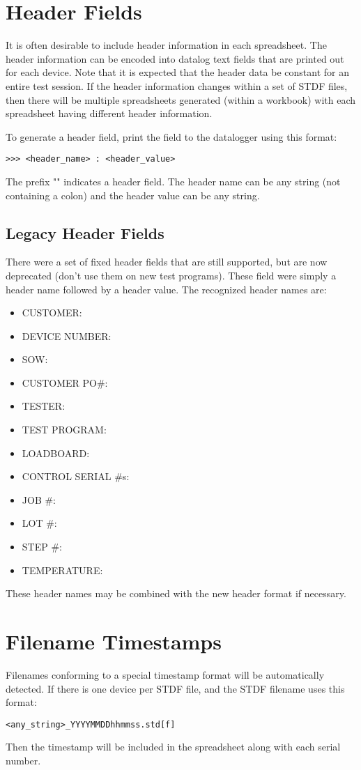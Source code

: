 \documentclass[letterpaper]{article}
\begin{document}
\section{Header Fields}
It is often desirable to include header information in each spreadsheet.  The header information
can be encoded into datalog text fields that are printed out for each device.  Note that it is
expected that the header data be constant for an entire test session.  If the header information
changes within a set of STDF files, then there will be multiple spreadsheets generated (within a workbook)
with each spreadsheet having different header information.

To generate a header field, print the field to the datalogger using this format:
\begin{verbatim}
>>> <header_name> : <header_value>
\end{verbatim}
The prefix "\gT\gT\gT" indicates a header field.  The header name can be any string (not containing a colon)
and the header value can be any string.
\clearpage
\subsection{Legacy Header Fields}
There were a set of fixed header fields that are still supported, but are now deprecated (don't use them on new test programs).
These field were simply a header name followed by a header value.  The recognized header names
are:
\begin{itemize}
\item CUSTOMER:
\item DEVICE NUMBER:
\item SOW:
\item CUSTOMER PO\#:
\item TESTER:
\item TEST PROGRAM:
\item LOADBOARD:
\item CONTROL SERIAL \#s:
\item JOB \#:
\item LOT \#:
\item STEP \#:
\item TEMPERATURE:
\end{itemize}

These header names may be combined with the new header format if necessary.

\section{Filename Timestamps}
Filenames conforming to a special timestamp format will be automatically detected. 
If there is one device per STDF file, and the STDF filename uses this format:
\begin{verbatim}
<any_string>_YYYYMMDDhhmmss.std[f]
\end{verbatim}
Then the timestamp will be included in the spreadsheet along with each serial number.
\end{document}

